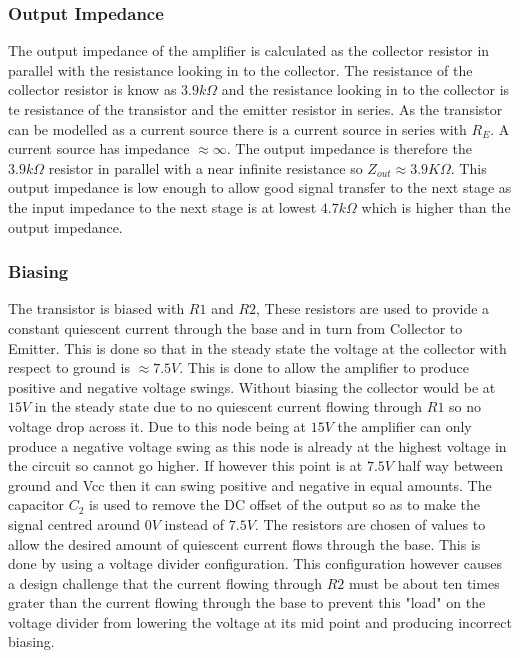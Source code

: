 \documentclass[10pt,a4paper]{article}
\begin{document}
\subsubsection{Output Impedance}
The output impedance of the amplifier is calculated as the collector resistor in parallel with the resistance looking in to the collector. The resistance of the collector resistor is know as $3.9k\Omega$ and the resistance looking in to the collector is te resistance of the transistor and the emitter resistor in series. As the transistor can be modelled as a current source there is a current source in series with $R_E$. A current source has impedance $\approx \infty$. The output impedance is therefore the $3.9k\Omega$ resistor in parallel with a near infinite resistance so $Z_{out} \approx 3.9K\Omega$. This output impedance is low enough to allow good signal transfer to the next stage as the input impedance to the next stage is at lowest $4.7k\Omega$ which is higher than the output impedance.
\subsubsection{Biasing}
The transistor is biased with $R1$ and $R2$, These resistors are used to provide a constant quiescent current through the base and in turn from Collector to Emitter. This is done so that in the steady state the voltage at the collector with respect to ground is $\approx 7.5V$. This is done to allow the amplifier to produce positive and negative voltage swings. Without biasing the collector would be at $15V$ in the steady state due to no quiescent current flowing through $R1$ so no voltage drop across it. Due to this node being at $15V$ the amplifier can only produce a negative voltage swing as this node is already at the highest voltage in the circuit so cannot go higher. If however this point is at $7.5V$ half way between ground and Vcc then it can swing positive and negative in equal amounts. The capacitor $C_2$ is used to remove the DC offset of the output so as to make the signal centred around $0V$ instead of $7.5V$.\newline
      The resistors are chosen of values to allow the desired amount of quiescent  current flows through the base. This is done by using a voltage divider configuration. This configuration however causes a design challenge that the current flowing through $R2$ must be about ten times grater than the current flowing through the base to prevent this "load" on the voltage divider from lowering the voltage at its mid point and producing incorrect biasing.    
\end{document}
